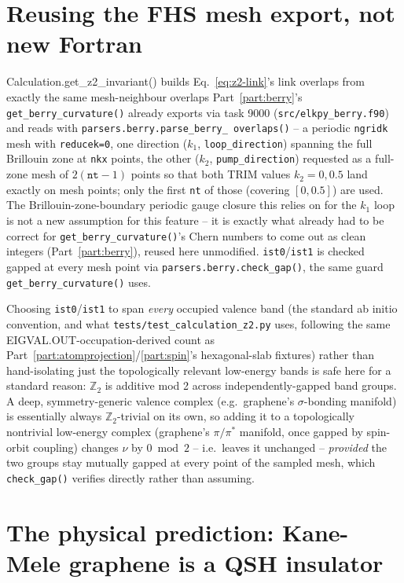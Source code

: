 \documentclass[11pt]{article}
\begin{document}
\section{Reusing the FHS mesh export, not new Fortran}

Calculation.get\_z2\_invariant() builds Eq.~\eqref{eq:z2-link}'s link overlaps from
exactly the same mesh-neighbour overlaps Part~\ref{part:berry}'s
\texttt{get\_berry\_curvature()} already exports via task 9000
(\texttt{src/elkpy\_berry.f90}) and reads with \texttt{parsers.berry.parse\_berry\_
overlaps()} -- a periodic \texttt{ngridk} mesh with \texttt{reducek=0}, one direction
($k_1$, \texttt{loop\_direction}) spanning the full Brillouin zone at \texttt{nkx}
points, the other ($k_2$, \texttt{pump\_direction}) requested as a full-zone mesh of
$2(\texttt{nt}{-}1)$ points so that both TRIM values $k_2=0,0.5$ land exactly on mesh
points; only the first \texttt{nt} of those (covering $[0,0.5]$) are used. The
Brillouin-zone-boundary periodic gauge closure this relies on for the $k_1$ loop is not
a new assumption for this feature -- it is exactly what already had to be correct for
\texttt{get\_berry\_curvature()}'s Chern numbers to come out as clean integers
(Part~\ref{part:berry}), reused here unmodified. \texttt{ist0}/\texttt{ist1} is checked
gapped at every mesh point via \texttt{parsers.berry.check\_gap()}, the same guard
\texttt{get\_berry\_curvature()} uses.

Choosing \texttt{ist0}/\texttt{ist1} to span \emph{every} occupied valence band (the
standard ab initio convention, and what \texttt{tests/test\_calculation\_z2.py} uses,
following the same EIGVAL.OUT-occupation-derived count as
Part~\ref{part:atomprojection}/\ref{part:spin}'s hexagonal-slab fixtures) rather than
hand-isolating just the topologically relevant low-energy bands is safe here for a
standard reason: $\mathbb Z_2$ is additive mod 2 across independently-gapped band
groups. A deep, symmetry-generic valence complex (e.g.\ graphene's $\sigma$-bonding
manifold) is essentially always $\mathbb Z_2$-trivial on its own, so adding it to a
topologically nontrivial low-energy complex (graphene's $\pi/\pi^*$ manifold, once
gapped by spin-orbit coupling) changes $\nu$ by $0 \bmod 2$ -- i.e.\ leaves it unchanged
-- \emph{provided} the two groups stay mutually gapped at every point of the sampled
mesh, which \texttt{check\_gap()} verifies directly rather than assuming.

\section{The physical prediction: Kane-Mele graphene is a QSH insulator}
\end{document}

